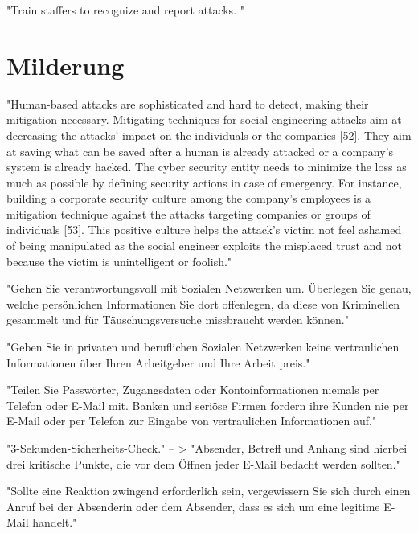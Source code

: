 "Train staffers to recognize and report attacks. "\cite{3_barracuda}

\section{Milderung}

"Human-based attacks are sophisticated and hard to detect, making their mitigation necessary. Mitigating techniques for social engineering attacks aim at
decreasing the attacks’ impact on the individuals or the companies [52]. They aim at saving what can be saved after a human is already attacked or a company’s
system is already hacked. The cyber security entity needs to minimize the loss as much as possible by defining security actions in case of emergency. For instance,
building a corporate security culture among the company’s employees is a mitigation technique against the attacks targeting companies or groups of individuals [53].
This positive culture helps the attack’s victim not feel ashamed of being manipulated as the social engineer exploits the misplaced trust and not because the victim
is unintelligent or foolish."\cite{7_mdpi}


"Gehen Sie verantwortungsvoll mit Sozialen Netzwerken um. Überlegen Sie genau, welche persönlichen Informationen Sie dort offenlegen, da diese von
Kriminellen gesammelt und für Täuschungsversuche missbraucht werden können."\cite{2_bsi}

"Geben Sie in privaten und beruflichen Sozialen Netzwerken keine vertraulichen Informationen über Ihren Arbeitgeber und Ihre Arbeit preis."\cite{2_bsi}

"Teilen Sie Passwörter, Zugangsdaten oder Kontoinformationen niemals per Telefon oder E-Mail mit. Banken und seriöse Firmen fordern ihre Kunden nie per
E-Mail oder per Telefon zur Eingabe von vertraulichen Informationen auf."\cite{2_bsi}

"3-Sekunden-Sicherheits-Check."\cite{2_bsi}
-- > "Absender, Betreff und Anhang sind hierbei drei kritische Punkte, die vor dem Öffnen jeder E-Mail bedacht werden sollten."

"Sollte eine Reaktion zwingend erforderlich sein, vergewissern Sie sich durch einen Anruf bei der Absenderin oder dem Absender, dass es sich um eine
legitime E-Mail handelt."\cite{2_bsi}
